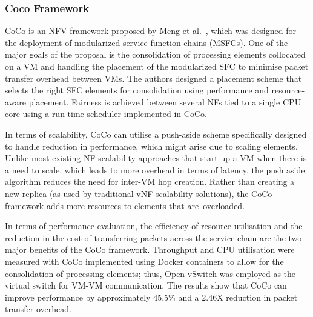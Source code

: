 \documentclass[futureinternet,review,accept,pdftex,moreauthors]{Definitions/mdpi}
\begin{document}
\subsubsection{Coco Framework}
\label{CoCo}
CoCo is an NFV framework proposed by Meng {et al.}~\cite{meng2018coco}, which was designed for the deployment of modularized service function chains (MSFCs). One of the major goals of the proposal is the consolidation of processing elements collocated on a VM and handling the placement of the modularized SFC to minimise packet transfer overhead between VMs. The authors designed a placement scheme that selects the right SFC elements for consolidation using performance and resource-aware placement. Fairness is achieved between several NFs tied to a single CPU core using a run-time scheduler implemented in CoCo. 

In terms of scalability, CoCo can utilise a push-aside scheme specifically designed to handle reduction in performance, which might arise due to scaling elements. Unlike most existing NF scalability approaches that start up a VM when there is a need to scale, which leads to more overhead in terms of latency, the push aside algorithm reduces the need for inter-VM hop creation. Rather than creating a new replica (as used by traditional vNF scalability solutions), the CoCo framework adds more resources to elements that are~overloaded.   

In terms of performance evaluation, the efficiency of resource utilisation and the reduction in the cost of transferring packets across the service chain are the two major benefits of the CoCo framework. Throughput and CPU utilisation were measured with CoCo implemented using Docker containers to allow for the consolidation of processing elements; thus, Open vSwitch was employed as the virtual switch for VM-VM communication. The results show that CoCo can improve performance by approximately 45.5\% and a 2.46X reduction in packet transfer overhead.
\end{document}
